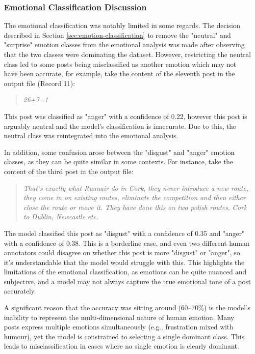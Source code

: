 \documentclass[12pt, a4paper]{article}
\begin{document}
\subsubsection{Emotional Classification Discussion}
The emotional classification was notably limited in some regards. The decision described in Section \ref{sec:emotion-classification} to remove the "neutral" and "surprise" emotion classes from the emotional analysis was made after observing that the two classes were dominating the dataset. However, restricting the neutral class led to some posts being misclassified as another emotion which may not have been accurate, for example, take the content of the eleventh post in the output file (Record 11):

\begin{quote}
    \textit{26+7=1}
\end{quote}

This post was classified as "anger" with a confidence of 0.22, however this post is arguably neutral and the model's classification is inaccurate. Due to this, the neutral class was reintegrated into the emotional analysis.

In addition, some confusion arose between the "disgust" and "anger" emotion classes, as they can be quite similar in some contexts. For instance, take the content of the third post in the output file:

\begin{quote}
    \textit{That's exactly what Ruanair do in Cork, they never introduce a new route, they come in on existing routes, eliminate the competition and then either close the route or move it. They have done this on two polish routes, Cork to Dublin, Newcastle etc.}
\end{quote}

The model classified this post as "disgust" with a confidence of 0.35 and "anger" with a confidence of 0.38. This is a borderline case, and even two different human annotators could disagree on whether this post is more "disgust" or "anger", so it's understandable that the model would struggle with this. This highlights the limitations of the emotional classification, as emotions can be quite nuanced and subjective, and a model may not always capture the true emotional tone of a post accurately.

A significant reason that the accuracy was sitting around (60–70\%) is the model’s inability to represent the multi-dimensional nature of human emotion. Many posts express multiple emotions simultaneously (e.g., frustration mixed with humour), yet the model is constrained to selecting a single dominant class. This leads to misclassification in cases where no single emotion is clearly dominant.
\end{document}
